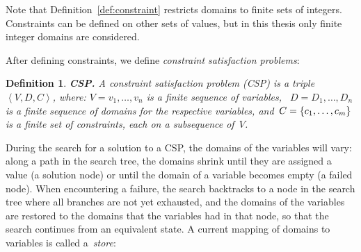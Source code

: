 \documentclass[a4paper,11pt]{article}
\newtheorem{definition}{Definition}
\numberwithin{equation}{section}
\begin{document}
Note that Definition~\ref{def:constraint} restricts domains to
finite sets of integers. Constraints can be defined on
other sets of values, but in this thesis only finite integer domains
are considered.

After defining constraints, we define \emph{constraint satisfaction problems}:

\begin{definition}
  \textbf{CSP.} A constraint satisfaction problem (CSP) is a 
  triple~$\left<V,D,C\right>$, where:
  $V = v_1, \ldots, v_n$ is a finite sequence of variables,
  ~$D = D_1, \ldots, D_n$ is a finite sequence of domains for the respective variables,
  and~$C = \left\{c_1, \ldots, c_m\right\}$ is a finite set of constraints, 
  each on a subsequence of~$V$.
\end{definition}

During the search for a solution to a CSP, the domains of the variables will vary: 
along a path in the search tree, the domains shrink
until they are assigned a value (a solution node) or until the domain
of a variable becomes empty (a failed node).
When encountering a failure, the search backtracks to a node in the search tree
where all branches are not yet exhausted,
and the domains of the variables are restored to the domains that the variables
had in that node, so that the search continues from an equivalent state.
A current mapping of domains to variables is called a~\emph{store}:
\end{document}
